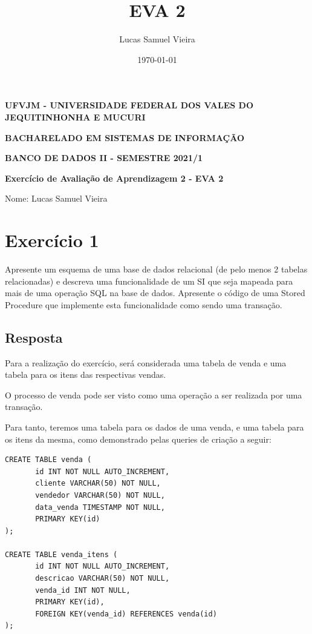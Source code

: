 \documentclass[article, a4paper, oneside, 11pt, english, brazil, sumario=tradicional]{abntex2}
\author{Lucas Samuel Vieira}
\date{\today}
\title{EVA 2}
\begin{document}
\OnehalfSpacing
\pretextual
\textual

\begin{center}
\textbf{UFVJM - UNIVERSIDADE FEDERAL DOS VALES DO JEQUITINHONHA E MUCURI}

\textbf{BACHARELADO EM SISTEMAS DE INFORMAÇÃO}

\textbf{BANCO DE DADOS II - SEMESTRE 2021/1}

\textbf{Exercício de Avaliação de Aprendizagem 2 - EVA 2}
\end{center}

\noindent
Nome: Lucas Samuel Vieira
\newline

\section{Exercício 1}
\label{sec:orga00e629}

Apresente um esquema  de uma base de  dados relacional (de pelo  menos 2 tabelas
relacionadas) e descreva uma funcionalidade de  um SI que seja mapeada para mais
de uma operação SQL na base de dados. Apresente o código de uma Stored Procedure
que implemente esta funcionalidade como sendo uma transação.

\subsection{Resposta}
\label{sec:orgd3adbc1}

Para  a realização  do exercício,  será considerada  uma tabela  de venda  e uma
tabela para os itens das respectivas vendas.

O processo  de venda pode ser  visto como uma  operação a ser realizada  por uma
transação.

Para tanto, teremos uma tabela para os dados  de uma venda, e uma tabela para os
itens da mesma, como demonstrado pelas queries de criação a seguir:

\begin{verbatim}
CREATE TABLE venda (
       id INT NOT NULL AUTO_INCREMENT,
       cliente VARCHAR(50) NOT NULL,
       vendedor VARCHAR(50) NOT NULL,
       data_venda TIMESTAMP NOT NULL,
       PRIMARY KEY(id)
);

CREATE TABLE venda_itens (
       id INT NOT NULL AUTO_INCREMENT,
       descricao VARCHAR(50) NOT NULL,
       venda_id INT NOT NULL,
       PRIMARY KEY(id),
       FOREIGN KEY(venda_id) REFERENCES venda(id)
);
\end{verbatim}
\end{document}
